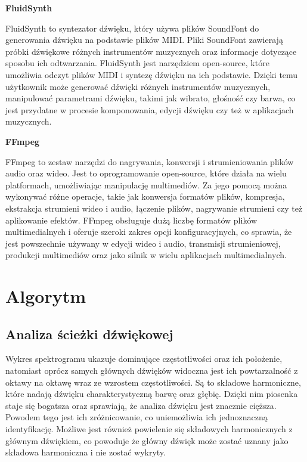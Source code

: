 \noindent\textbf{FluidSynth }\cite{fluidsynth}

FluidSynth to syntezator dźwięku, który używa plików SoundFont do generowania dźwięku na podstawie plików MIDI. Pliki SoundFont zawierają próbki dźwiękowe różnych instrumentów muzycznych oraz informacje dotyczące sposobu ich odtwarzania. FluidSynth jest narzędziem open-source, które umożliwia odczyt plików MIDI i syntezę dźwięku na ich podstawie. Dzięki temu użytkownik może generować dźwięki różnych instrumentów muzycznych, manipulować parametrami dźwięku, takimi jak wibrato, głośność czy barwa, co jest przydatne w procesie komponowania, edycji dźwięku czy też w aplikacjach muzycznych.

\newpage

\noindent\textbf{FFmpeg} \cite{ffmpeg}

FFmpeg to zestaw narzędzi do nagrywania, konwersji i strumieniowania plików audio oraz wideo. Jest to oprogramowanie open-source, które działa na wielu platformach, umożliwiając manipulację multimediów. Za jego pomocą można wykonywać różne operacje, takie jak konwersja formatów plików, kompresja, ekstrakcja strumieni wideo i audio, łączenie plików, nagrywanie strumieni czy też aplikowanie efektów. FFmpeg obsługuje dużą liczbę formatów plików multimedialnych i oferuje szeroki zakres opcji konfiguracyjnych, co sprawia, że jest powszechnie używany w edycji wideo i audio, transmisji strumieniowej, produkcji multimediów oraz jako silnik w wielu aplikacjach multimedialnych.

\section{Algorytm}

\subsection{Analiza ścieżki dźwiękowej}

Wykres spektrogramu ukazuje dominujące częstotliwości oraz ich położenie, natomiast oprócz samych głównych dźwięków widoczna jest ich powtarzalność z oktawy na oktawę wraz ze wzrostem częstotliwości. Są to składowe harmoniczne, które nadają dźwięku charakterystyczną barwę oraz głębię. Dzięki nim piosenka staje się bogatsza oraz sprawiają, że analiza dźwięku jest znacznie cięższa. Powodem tego jest ich zróżnicowanie, co uniemożliwia ich jednoznaczną identyfikację. Możliwe jest również powielenie się składowych harmonicznych z głównym dźwiękiem, co powoduje że główny dźwięk może zostać uznany jako składowa harmoniczna i nie zostać wykryty.
